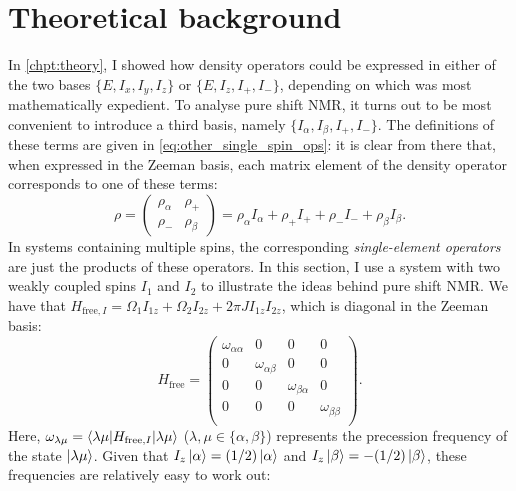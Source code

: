 \section{Theoretical background}
\label{sec:pureshift__intro_theory}

In \cref{chpt:theory}, I showed how density operators could be expressed in either of the two bases $\{E, I_x, I_y, I_z\}$ or $\{E, I_z, I_+, I_-\}$, depending on which was most mathematically expedient.
To analyse pure shift NMR, it turns out to be most convenient to introduce a third basis, namely $\{I_\alpha, I_\beta, I_+, I_-\}$\autocite{Keeler2010,Thrippleton2005JMR,Griesinger1986JCP}.
The definitions of these terms are given in \cref{eq:other_single_spin_ops}: it is clear from there that, when expressed in the Zeeman basis, each matrix element of the density operator corresponds to one of these terms:
\begin{equation}
    \label{eq:single_element_operators}
    \rho = \begin{pmatrix}\rho_\alpha & \rho_+ \\ \rho_- & \rho_\beta\end{pmatrix}
     = \rho_\alpha I_\alpha + \rho_+ I_+ + \rho_- I_- + \rho_\beta I_\beta.
\end{equation}
In systems containing multiple spins, the corresponding \textit{single-element operators} are just the products of these operators.
In this section, I use a system with two weakly coupled spins $I_1$ and $I_2$ to illustrate the ideas behind pure shift NMR.
We have that $H_{\text{free},I} = \Omega_1 I_{1z} + \Omega_2 I_{2z} + 2\pi JI_{1z}I_{2z}$, which is diagonal in the Zeeman basis:
\begin{equation}
    \label{eq:h_free_weak}
    H_\text{free} = \begin{pmatrix}
        \omega_{\alpha\alpha} & 0 & 0 & 0 \\
        0 & \omega_{\alpha\beta} & 0 & 0 \\
        0 & 0 & \omega_{\beta\alpha} & 0 \\
        0 & 0 & 0 & \omega_{\beta\beta} \\
    \end{pmatrix}.
\end{equation}
Here, $\omega_{\lambda\mu} = \braket{\lambda\mu|H_{\text{free},I}|\lambda\mu}$ ($\lambda, \mu \in \{\alpha, \beta\}$) represents the precession frequency of the state $\ket{\lambda\mu}$.
Given that $I_z\ket{\alpha} = (1/2)\ket{\alpha}$ and $I_z\ket{\beta} = -(1/2)\ket{\beta}$, these frequencies are relatively easy to work out:
